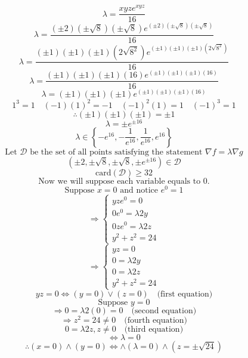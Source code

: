 \documentclass[12pt, letterpaper]{report}
\begin{document}
    \[
        \lambda =\frac{xyze^{xyz}}{16}
    \]
    \[
        \lambda =\frac{\left( \pm 2 \right)\left( \pm \sqrt{8}  \right)\left( \pm \sqrt{8}  \right)e^{\left( \pm 2 \right)\left( \pm \sqrt{8}  \right)\left( \pm \sqrt{8}  \right)}}{16}
    \]
    \[
        \lambda =\frac{(\pm 1)(\pm 1)(\pm 1)\left( 2\sqrt{8^2}  \right)e^{(\pm 1)(\pm 1)(\pm 1)\left( 2\sqrt{8^2}\right)}}{16}
    \]
    \[
        \lambda =\frac{(\pm 1)(\pm 1)(\pm 1)\left( 16 \right) e^{(\pm 1)(\pm 1)(\pm 1)(16)}}{16}
    \]
    \[
        \lambda =(\pm 1)(\pm 1)(\pm 1) e^{(\pm 1)(\pm 1)(\pm 1)(16)}
    \]
    \[
        1^3=1\quad (-1)(1)^2=-1\quad (-1)^2 (1)=1\quad (-1)^3=1
    \]
    \[
        \therefore (\pm 1)(\pm 1)(\pm 1)=\pm 1
    \]
    \[
        \lambda =\pm e^{\pm 16}
    \]
    \[
        \lambda \in \left\{ -e^{16} ,-\frac{1}{e^{16} },\frac{1}{e^{16} },e^{16}  \right\} 
    \]
    \[
        \text{Let }\mathcal{D} \text{ be the set of all points satisfying the statement }\nabla f=\lambda \nabla g 
    \]
    \[
        \left( \pm 2,\pm\sqrt{8},\pm\sqrt{8}, \pm e^{\pm 16}  \right) \in\mathcal{D} 
    \]
    \[
        \text{card}(\mathcal{D} )\geq 32 
    \]
    \[
        \text{Now we will suppose each variable equals to }0\text{.}  
    \]
    \[
        \text{Suppose }x=0 \text{ and notice }e^0=1 
    \]
    \[
        \Longrightarrow \left\{\begin{array}{c}
            yze^{0}= 0\\
            0e^{0}=\lambda 2y\\
            0ze^{0}=\lambda 2z\\
            y^2 +z^2=24
        \end{array}\right.
    \]
    \[
        \Longrightarrow \left\{\begin{array}{c}
            yz= 0\\
            0=\lambda 2y\\
            0=\lambda 2z\\
            y^2 +z^2=24
        \end{array}\right.
    \]
    \[
        yz=0\iff (y=0)\lor( z=0)\quad \text{(first equation)}
    \]
    \[
        \text{Suppose }y=0 
    \]
    \[
        \Longrightarrow 0=\lambda 2(0)=0\quad \text{(second equation)} 
    \]
    \[
        \Longrightarrow z^2=24\neq 0\quad \text{(fourth equation)}
    \]
    \[
        0=\lambda 2z,z\neq 0\quad \text{(third equation)}
    \]
    \[
        \iff \lambda =0
    \]
    \[
        \therefore (x=0)\land (y=0) \iff \land (\lambda =0)\land \left(z=\pm\sqrt{24} \right)
    \]
\end{document}
